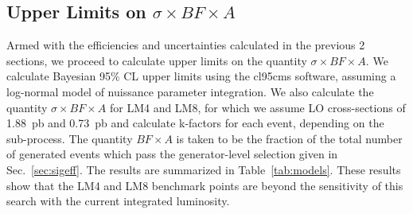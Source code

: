 \subsection{Upper Limits on $\sigma \times BF \times A$}

Armed with the efficiencies and uncertainties calculated in the previous 2 sections, we proceed
to calculate upper limits on the quantity $\sigma \times BF \times A$. We calculate Bayesian 95\% CL upper
limits using the cl95cms software, assuming a log-normal model of nuissance parameter integration.
We also calculate the quantity $\sigma \times BF \times A$ for LM4 and LM8, for which we assume LO
cross-sections of 1.88~pb and 0.73~pb and calculate k-factors for each event, depending on the sub-process.
The quantity $BF \times A$ is taken to be the fraction of the total number of generated events which
pass the generator-level selection given in Sec.~\ref{sec:sigeff}. The results are summarized in
Table~\ref{tab:models}. These results show that the LM4 and LM8 benchmark points are beyond the
sensitivity of this search with the current integrated luminosity.

